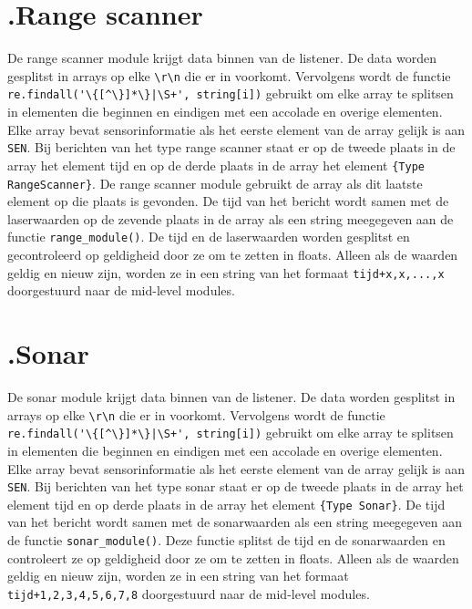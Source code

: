 \documentclass[a4paper,10pt]{article}
\begin{document}
\section*{\label{rangescanner}\thesection.\quad Range scanner}
De range scanner module krijgt data binnen van de listener. De data worden gesplitst in arrays op elke \verb!\r\n! die er in voorkomt. Vervolgens wordt de functie \verb!re.findall('\{[^\}]*\}|\S+', string[i])! gebruikt om elke array te splitsen in elementen die beginnen en eindigen met een accolade en overige elementen. Elke array bevat sensorinformatie als het eerste element van de array gelijk is aan \verb!SEN!. Bij berichten van het type range scanner staat er op de tweede plaats in de array het element tijd en op de derde plaats in de array het element \verb!{Type RangeScanner}!. De range scanner module gebruikt de array als dit laatste element op die plaats is gevonden. De tijd van het bericht wordt samen met de laserwaarden op de zevende plaats in de array als een string meegegeven aan de functie \verb!range_module()!. De tijd en de laserwaarden worden gesplitst en gecontroleerd op geldigheid door ze om te zetten in floats. Alleen als de waarden geldig en nieuw zijn, worden ze in een string van het formaat \verb!tijd+x,x,...,x! doorgestuurd naar de mid-level modules.

\section*{\label{sonar}\thesection.\quad Sonar}
De sonar module krijgt data binnen van de listener. De data worden gesplitst in arrays op elke \verb!\r\n! die er in voorkomt. Vervolgens wordt de functie \verb!re.findall('\{[^\}]*\}|\S+', string[i])! gebruikt om elke array te splitsen in elementen die beginnen en eindigen met een accolade en overige elementen. Elke array bevat sensorinformatie als het eerste element van de array gelijk is aan \verb!SEN!. Bij berichten van het type sonar staat er op de tweede plaats in de array het element tijd en op derde plaats in de array het element \verb!{Type Sonar}!. De tijd van het bericht wordt samen met de sonarwaarden als een string meegegeven aan de functie \verb!sonar_module()!. Deze functie splitst de tijd en de sonarwaarden en controleert ze op geldigheid door ze om te zetten in floats. Alleen als de waarden geldig en nieuw zijn, worden ze in een string van het formaat \verb!tijd+1,2,3,4,5,6,7,8! doorgestuurd naar de mid-level modules.
\end{document}
